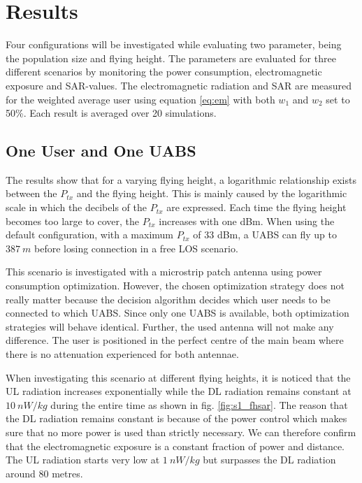 \documentclass[twocolumn]{phdsymp} %
\begin{document}
\section{Results}
Four configurations will be investigated while evaluating two parameter, being the population size and flying height.
The parameters are evaluated for three different scenarios by monitoring the power consumption, electromagnetic exposure and \gls{SAR}-values.
The electromagnetic radiation and \gls{SAR} are 
measured for the weighted average user using 
equation \ref{eq:em} with both $w_{1}$ and $w_{2}$ set to 50\%. Each result is averaged over 20 simulations. 

\subsection{One User and One \gls{UABS}}
The  results show that for a varying flying height, a logarithmic relationship exists between the $P_{tx}$ and the flying height. 
This is mainly caused by the logarithmic 
scale in which the decibels of the $P_{tx}$ are expressed.
Each time the flying height becomes too large to cover, the 
$P_{tx}$ increases with one dBm. 
When using the default configuration, with a maximum $P_{tx}$ of 33 dBm,
a \gls{UABS} can fly up to $387\ m$ before losing connection in a free \gls{LOS} scenario.

This scenario is investigated with a microstrip patch antenna using power consumption optimization. 
 However, the chosen optimization strategy does not really matter because the decision 
 algorithm decides which user 
needs to be connected to which \gls{UABS}. Since only one \gls{UABS} is available, both optimization strategies will behave identical.
Further, the used antenna will not make any difference.
The user is positioned in the perfect centre of the main beam where there is 
no attenuation experienced for both antennae.

When investigating this scenario at different flying heights, it is noticed
that the \gls{UL} radiation increases exponentially while 
the \gls{DL} radiation remains constant at $10\ nW/kg$ during the entire time as shown in fig. \ref{fig:s1_fhsar}. The reason that the \gls{DL} radiation
remains constant is because of the power control which makes sure that no more power is used than strictly necessary. 
We can therefore confirm that the electromagnetic exposure is a constant fraction of power and distance.
The \gls{UL} radiation starts very low at $1\ nW/kg$ but surpasses the \gls{DL} radiation 
around 80 metres.
\end{document}
